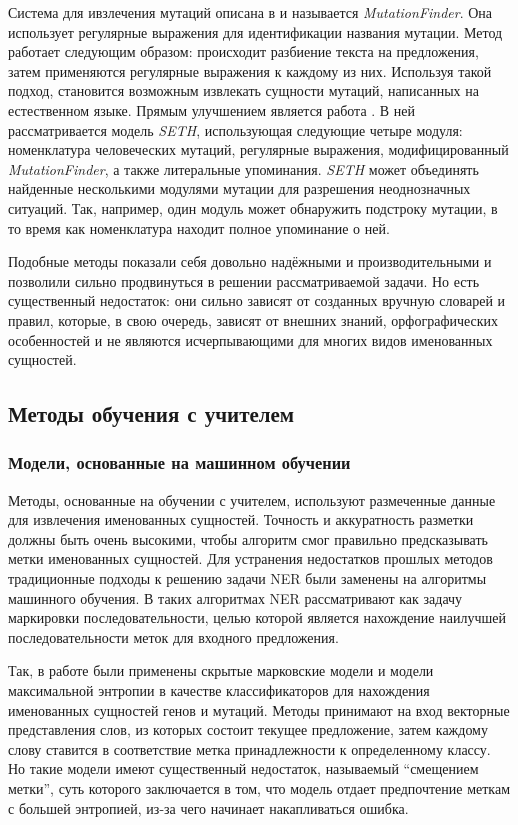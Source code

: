 \documentclass[12pt, a4paper]{article} %
\begin{document}
Система для ивзлечения мутаций описана в \cite{Caporaso2007} и называется \textit{MutationFinder}. Она использует регулярные выражения для идентификации названия мутации. Метод работает следующим образом: происходит разбиение текста на предложения, затем применяются регулярные выражения к каждому из них. Используя такой подход, становится возможным извлекать сущности мутаций, написанных на естественном языке. Прямым улучшением \cite{Caporaso2007} является работа \cite{Thomas2016}. В ней рассматривается модель \textit{SETH}, использующая следующие четыре модуля: номенклатура человеческих мутаций, регулярные выражения, модифицированный \textit{MutationFinder}, а также литеральные упоминания. \textit{SETH} может объединять найденные несколькими модулями мутации для разрешения неоднозначных ситуаций. Так, например, один модуль может обнаружить подстроку мутации, в то время как номенклатура находит полное упоминание о ней.

\bigskip

Подобные методы показали себя довольно надёжными и производительными и позволили сильно продвинуться в решении рассматриваемой задачи. Но есть существенный недостаток: они сильно зависят от созданных вручную словарей и правил, которые, в свою очередь, зависят от внешних знаний, орфографических особенностей и не являются исчерпывающими для многих видов именованных сущностей.


\subsection{Методы обучения с учителем}
\subsubsection{Модели, основанные на машинном обучении}
Методы, основанные на обучении с учителем, используют размеченные данные для извлечения именованных сущностей. Точность и аккуратность разметки должны быть очень высокими, чтобы алгоритм смог правильно предсказывать метки именованных сущностей.
Для устранения недостатков прошлых методов традиционные подходы к решению задачи NER были заменены на алгоритмы машинного обучения. В таких алгоритмах NER рассматривают как задачу маркировки последовательности, целью которой является нахождение наилучшей последовательности меток для входного предложения.

Так, в работе \cite{pmid28200120} были применены скрытые марковские модели и модели максимальной энтропии в качестве классификаторов для нахождения именованных сущностей генов и мутаций. Методы принимают на вход векторные представления слов, из которых состоит текущее предложение, затем каждому слову ставится в соответствие метка принадлежности к определенному классу. Но такие модели имеют существенный недостаток, называемый ``смещением метки'', суть которого заключается в том, что модель отдает предпочтение меткам с большей энтропией, из-за чего начинает накапливаться ошибка.
\end{document}
